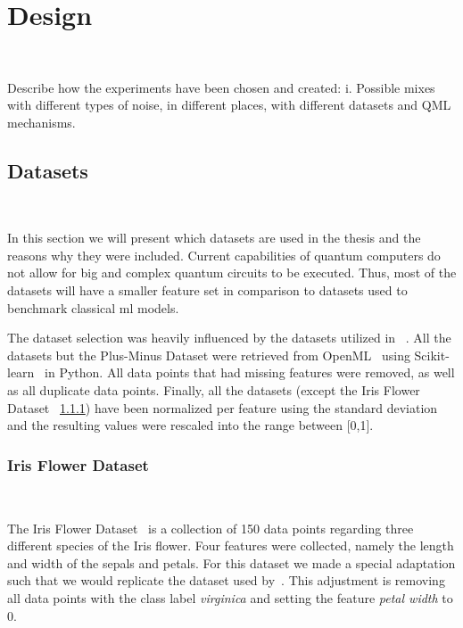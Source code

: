 \chapter{Design}\label{chapter:design} \

Describe how the experiments have been chosen and created:
  i.	Possible mixes with different types of noise, in different places, with different datasets and QML mechanisms.

\section{Datasets}\label{section:datasets} \

In this section we will present which datasets are used in the thesis
and the reasons why they were included. Current capabilities of
quantum computers do not allow for big and complex quantum circuits
to be executed. Thus, most of the datasets will have a smaller
feature set in comparison to datasets used to benchmark classical
\ac{ml} models. \

The dataset selection was heavily influenced by the datasets utilized in
~\cite{winderl_quantum_2023}. All the datasets but the Plus-Minus
Dataset were retrieved from OpenML~\cite{vanschoren_openml_2014} using
Scikit-learn~\cite{pedregosa_scikit-learn_2011} in Python. All data
points that had missing features were removed, as well as all duplicate
data points. Finally, all the datasets (except the Iris Flower Dataset
~\ref{subsection:iris}) have been normalized per feature using the
standard deviation and the resulting values were rescaled into the
range between  [0,1]. \

\subsection{Iris Flower Dataset}\label{subsection:iris} \

The Iris Flower Dataset~\cite{fisher_use_1936} is a collection of
150 data points regarding three different species of the Iris flower.
Four features were collected, namely the length and width of the sepals
and petals. For this dataset we made a special adaptation such that
we would replicate the dataset used by~\cite{du_quantum_2021}. This
adjustment is removing all data points with the class label
\textit{virginica} and setting the feature \textit{petal width}
to \(0\). \

